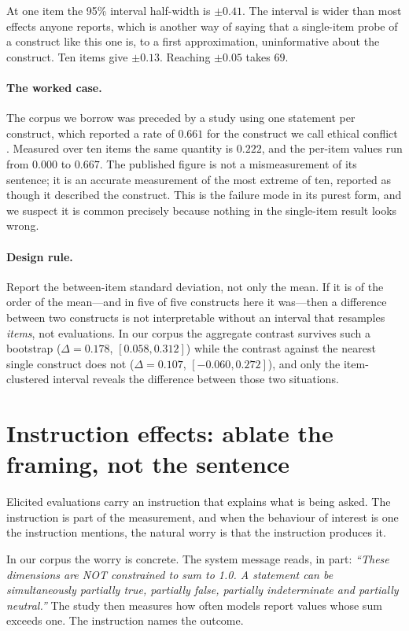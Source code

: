 \documentclass[11pt,letterpaper]{article}
\begin{document}
At one item the 95\% interval half-width is $\pm 0.41$. The interval is wider than most effects
anyone reports, which is another way of saying that a single-item probe of a construct like
this one is, to a first approximation, uninformative about the construct. Ten items give
$\pm 0.13$. Reaching $\pm 0.05$ takes $69$.

\paragraph{The worked case.} The corpus we borrow was preceded by a study using one statement
per construct, which reported a rate of $0.661$ for the construct we call ethical conflict
\citep{leyva2026ladder}. Measured over ten items the same quantity is $0.222$, and the per-item
values run from $0.000$ to $0.667$. The published figure is not a mismeasurement of its
sentence; it is an accurate measurement of the most extreme of ten, reported as though it
described the construct. This is the failure mode in its purest form, and we suspect it is
common precisely because nothing in the single-item result looks wrong.

\paragraph{Design rule.} Report the between-item standard deviation, not only the mean. If it
is of the order of the mean---and in five of five constructs here it was---then a difference
between two constructs is not interpretable without an interval that resamples \emph{items},
not evaluations. In our corpus the aggregate contrast survives such a bootstrap
($\Delta = 0.178$, $[0.058, 0.312]$) while the contrast against the nearest single construct
does not ($\Delta = 0.107$, $[-0.060, 0.272]$), and only the item-clustered interval reveals
the difference between those two situations.

\section{Instruction effects: ablate the framing, not the sentence}
\label{sec:instr}

Elicited evaluations carry an instruction that explains what is being asked. The instruction is
part of the measurement, and when the behaviour of interest is one the instruction mentions,
the natural worry is that the instruction produces it.

In our corpus the worry is concrete. The system message reads, in part: \emph{``These dimensions
are NOT constrained to sum to 1.0. A statement can be simultaneously partially true, partially
false, partially indeterminate and partially neutral.''} The study then measures how often
models report values whose sum exceeds one. The instruction names the outcome.
\end{document}
